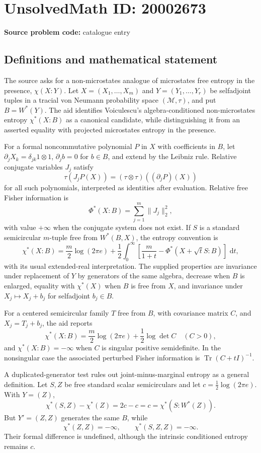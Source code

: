 \documentclass[11pt]{article}
\newcommand{\dd}{\,\mathrm{d}}
\begin{document}
\section*{UnsolvedMath ID: 20002673}
\textbf{Source problem code:} catalogue entry
\subsection{Definitions and mathematical statement}
The source asks for a non-microstates analogue of microstates free entropy in the presence, $\chi(X:Y)$. Let $X=(X_1,\ldots,X_m)$ and $Y=(Y_1,\ldots,Y_r)$ be selfadjoint tuples in a tracial von Neumann probability space $(\mathcal M,\tau)$, and put $B=W^*(Y)$. The aid identifies Voiculescu's algebra-conditioned non-microstates entropy $\chi^*(X:B)$ as a canonical candidate, while distinguishing it from an asserted equality with projected microstates entropy in the presence.

For a formal noncommutative polynomial $P$ in $X$ with coefficients in $B$, let $\partial_jX_k=\delta_{jk}1\otimes1$, $\partial_jb=0$ for $b\in B$, and extend by the Leibniz rule. Relative conjugate variables $J_j$ satisfy
\[
 \tau(J_jP(X))=(\tau\otimes\tau)((\partial_jP)(X))
\]
for all such polynomials, interpreted as identities after evaluation. Relative free Fisher information is
\[
 \Phi^*(X:B)=\sum_{j=1}^m\|J_j\|_2^2,
\]
with value $+\infty$ when the conjugate system does not exist. If $S$ is a standard semicircular $m$-tuple free from $W^*(B,X)$, the entropy convention is
\[
 \chi^*(X:B)=\frac m2\log(2\pi e)
  +\frac12\int_0^\infty\left[
          \frac m{1+t}-\Phi^*(X+\sqrt tS:B)\right]\,\dd t,
\]
with its usual extended-real interpretation. The supplied properties are invariance under replacement of $Y$ by generators of the same algebra, decrease when $B$ is enlarged, equality with $\chi^*(X)$ when $B$ is free from $X$, and invariance under $X_j\mapsto X_j+b_j$ for selfadjoint $b_j\in B$.

For a centered semicircular family $T$ free from $B$, with covariance matrix $C$, and $X_j=T_j+b_j$, the aid reports
\[
 \chi^*(X:B)=\frac m2\log(2\pi e)+\frac12\log\det C
 \quad(C>0),
\]
and $\chi^*(X:B)=-\infty$ when $C$ is singular positive semidefinite. In the nonsingular case the associated perturbed Fisher information is $\operatorname{Tr}(C+tI)^{-1}$.

A duplicated-generator test rules out joint-minus-marginal entropy as a general definition. Let $S,Z$ be free standard scalar semicirculars and let $c=\tfrac12\log(2\pi e)$. With $Y=(Z)$,
\[
 \chi^*(S,Z)-\chi^*(Z)=2c-c=c=\chi^*(S:W^*(Z)).
\]
But $Y'=(Z,Z)$ generates the same $B$, while
\[
 \chi^*(Z,Z)=-\infty,\qquad
 \chi^*(S,Z,Z)=-\infty.
\]
Their formal difference is undefined, although the intrinsic conditioned entropy remains $c$.
\end{document}
